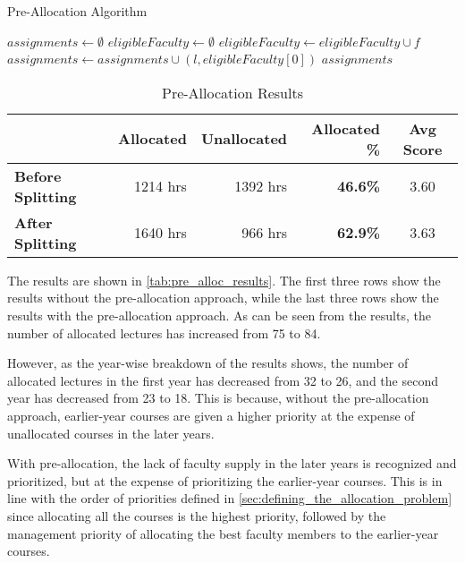\begin{algorithm}[H]
  \caption{Pre-Allocation Algorithm}
  \begin{algorithmic}[1]
    \State $assignments \gets \emptyset$
    \State $eligibleFaculty \gets \emptyset$
    \State $eligibleFaculty \gets eligibleFaculty \cup f$
    \EndIf
    \EndFor
    \State $assignments \gets assignments \cup (l, eligibleFaculty[0])$
    \EndIf
    \EndFor
    \State \Return $assignments$
    \EndProcedure
  \end{algorithmic}
  \label{alg:pre_allocation}
\end{algorithm}

\begin{table}[H]
  \centering
  \begin{tabular}{|l|r|r|r|c|}
    \hline
    \textbf{}                 & \textbf{Allocated} & \textbf{Unallocated} & \textbf{Allocated \%} & \textbf{Avg Score} \\ \hline
    \textbf{Before Splitting} & 1214 hrs           & 1392 hrs             & \textbf{46.6\%}       & 3.60               \\
    \textbf{After Splitting}  & 1640 hrs           & 966 hrs              & \textbf{62.9\%}       & 3.63               \\ \hline
  \end{tabular}
  \caption{Pre-Allocation Results}
  \label{tab:pre_alloc_results}
\end{table}

The results are shown in \autoref{tab:pre_alloc_results}. The first three rows show the results without the pre-allocation approach, while the last three rows show the results with the pre-allocation approach. As can be seen from the results, the number of allocated lectures has increased from 75 to 84.

However, as the year-wise breakdown of the results shows, the number of allocated lectures in the first year has decreased from 32 to 26, and the second year has decreased from 23 to 18. This is because, without the pre-allocation approach, earlier-year courses are given a higher priority at the expense of unallocated courses in the later years.

With pre-allocation, the lack of faculty supply in the later years is recognized and prioritized, but at the expense of prioritizing the earlier-year courses. This is in line with the order of priorities defined in \autoref{sec:defining_the_allocation_problem} since allocating all the courses is the highest priority, followed by the management priority of allocating the best faculty members to the earlier-year courses.


